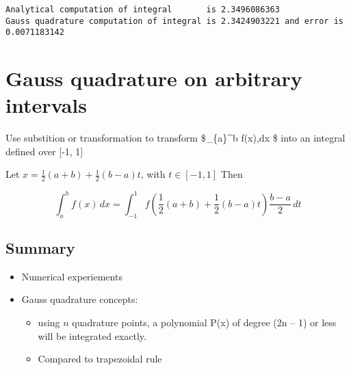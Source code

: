 \documentclass[11pt]{article}
\providecommand{\tightlist}{%
      \setlength{\itemsep}{0pt}\setlength{\parskip}{0pt}}
\begin{document}
    \begin{Verbatim}[commandchars=\\\{\}]
Analytical computation of integral       is 2.3496086363
Gauss quadrature computation of integral is 2.3424903221 and error is 0.0071183142

    \end{Verbatim}

    \section{Gauss quadrature on arbitrary
intervals}\label{gauss-quadrature-on-arbitrary-intervals}

Use substition or transformation to transform \$\int\_\{a\}\^{}b f(x),dx
\$ into an integral defined over {[}-1, 1{]}

Let \(x = \frac{1}{2}(a+b)+\frac{1}{2}(b-a)t\), with \(t \in [-1, 1]\)
Then

\[ \int_{a}^b f(x)\,dx = \int_{-1}^1 f\left(\frac{1}{2}(a+b)+\frac{1}{2}(b-a)t \right) \frac{b-a}{2}\,dt\]

    \subsection{Summary}\label{summary}

\begin{itemize}
\item
  Numerical experiements
\item
  Gauss quadrature concepts:

  \begin{itemize}
  \tightlist
  \item
    using \(n\) quadrature points, a polynomial P(x) of degree (2n -- 1)
    or less will be integrated exactly.
  \item
    Compared to trapezoidal rule
  \end{itemize}
\end{itemize}


    
    
    
    
\end{document}
